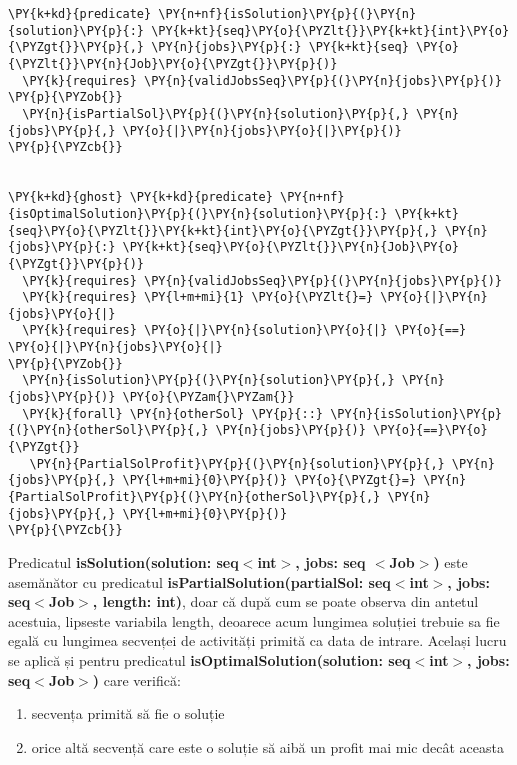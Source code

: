 \begin{Verbatim}[commandchars=\\\{\},fontsize=\small]
\PY{k+kd}{predicate} \PY{n+nf}{isSolution}\PY{p}{(}\PY{n}{solution}\PY{p}{:} \PY{k+kt}{seq}\PY{o}{\PYZlt{}}\PY{k+kt}{int}\PY{o}{\PYZgt{}}\PY{p}{,} \PY{n}{jobs}\PY{p}{:} \PY{k+kt}{seq} \PY{o}{\PYZlt{}}\PY{n}{Job}\PY{o}{\PYZgt{}}\PY{p}{)}
  \PY{k}{requires} \PY{n}{validJobsSeq}\PY{p}{(}\PY{n}{jobs}\PY{p}{)}
\PY{p}{\PYZob{}}
  \PY{n}{isPartialSol}\PY{p}{(}\PY{n}{solution}\PY{p}{,} \PY{n}{jobs}\PY{p}{,} \PY{o}{|}\PY{n}{jobs}\PY{o}{|}\PY{p}{)}
\PY{p}{\PYZcb{}}


\PY{k+kd}{ghost} \PY{k+kd}{predicate} \PY{n+nf}{isOptimalSolution}\PY{p}{(}\PY{n}{solution}\PY{p}{:} \PY{k+kt}{seq}\PY{o}{\PYZlt{}}\PY{k+kt}{int}\PY{o}{\PYZgt{}}\PY{p}{,} \PY{n}{jobs}\PY{p}{:} \PY{k+kt}{seq}\PY{o}{\PYZlt{}}\PY{n}{Job}\PY{o}{\PYZgt{}}\PY{p}{)}
  \PY{k}{requires} \PY{n}{validJobsSeq}\PY{p}{(}\PY{n}{jobs}\PY{p}{)}
  \PY{k}{requires} \PY{l+m+mi}{1} \PY{o}{\PYZlt{}=} \PY{o}{|}\PY{n}{jobs}\PY{o}{|}
  \PY{k}{requires} \PY{o}{|}\PY{n}{solution}\PY{o}{|} \PY{o}{==} \PY{o}{|}\PY{n}{jobs}\PY{o}{|}
\PY{p}{\PYZob{}}
  \PY{n}{isSolution}\PY{p}{(}\PY{n}{solution}\PY{p}{,} \PY{n}{jobs}\PY{p}{)} \PY{o}{\PYZam{}\PYZam{}}
  \PY{k}{forall} \PY{n}{otherSol} \PY{p}{::} \PY{n}{isSolution}\PY{p}{(}\PY{n}{otherSol}\PY{p}{,} \PY{n}{jobs}\PY{p}{)} \PY{o}{==}\PY{o}{\PYZgt{}}
   \PY{n}{PartialSolProfit}\PY{p}{(}\PY{n}{solution}\PY{p}{,} \PY{n}{jobs}\PY{p}{,} \PY{l+m+mi}{0}\PY{p}{)} \PY{o}{\PYZgt{}=} \PY{n}{PartialSolProfit}\PY{p}{(}\PY{n}{otherSol}\PY{p}{,} \PY{n}{jobs}\PY{p}{,} \PY{l+m+mi}{0}\PY{p}{)}
\PY{p}{\PYZcb{}}
\end{Verbatim}

Predicatul \textbf{isSolution(solution: seq$<$int$>$, jobs: seq $<$Job$>$)} este asemănător cu predicatul  \textbf{isPartialSolution(partialSol: seq$<$int$>$, jobs: seq$<$Job$>$, length: int)}, doar că după cum se poate observa din antetul acestuia, lipseste variabila length, deoarece acum lungimea soluției trebuie sa fie egală cu lungimea secvenței de activități primită ca data de intrare. Același lucru se aplică și pentru predicatul \textbf{isOptimalSolution(solution: seq$<$int$>$, jobs: seq$<$Job$>$)} care verifică:
\begin{enumerate}
    \item secvența primită să fie o soluție 
    \item orice altă secvență care este o soluție să aibă un profit mai mic decât aceasta
\end{enumerate}

